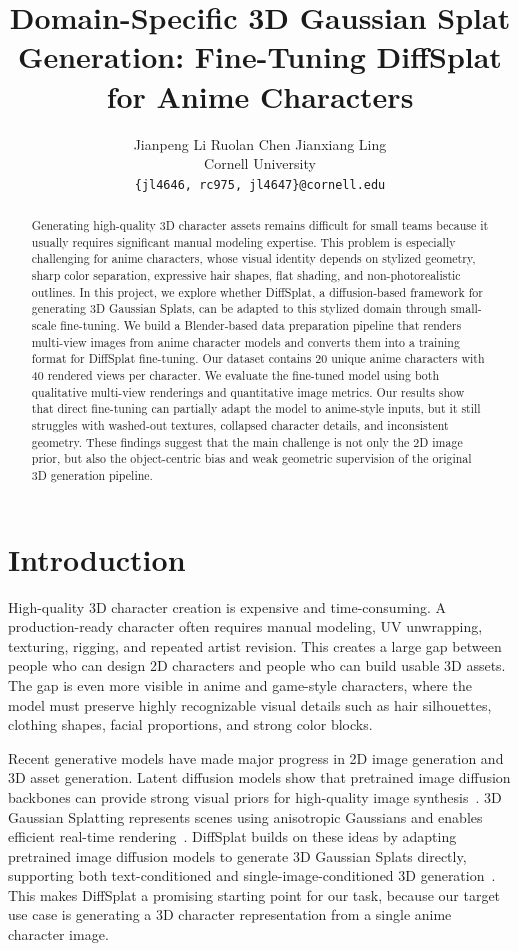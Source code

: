 \documentclass[10pt,twocolumn,letterpaper]{article}
\title{Domain-Specific 3D Gaussian Splat Generation: Fine-Tuning DiffSplat for Anime Characters}
\author{
Jianpeng Li \qquad Ruolan Chen \qquad Jianxiang Ling\\
Cornell University\\
{\tt\small \{jl4646, rc975, jl4647\}@cornell.edu}
}
\begin{document}
\maketitle

\begin{abstract}
Generating high-quality 3D character assets remains difficult for small teams because it usually requires significant manual modeling expertise. This problem is especially challenging for anime characters, whose visual identity depends on stylized geometry, sharp color separation, expressive hair shapes, flat shading, and non-photorealistic outlines. In this project, we explore whether DiffSplat, a diffusion-based framework for generating 3D Gaussian Splats, can be adapted to this stylized domain through small-scale fine-tuning. We build a Blender-based data preparation pipeline that renders multi-view images from anime character models and converts them into a training format for DiffSplat fine-tuning. Our dataset contains 20 unique anime characters with 40 rendered views per character. We evaluate the fine-tuned model using both qualitative multi-view renderings and quantitative image metrics. Our results show that direct fine-tuning can partially adapt the model to anime-style inputs, but it still struggles with washed-out textures, collapsed character details, and inconsistent geometry. These findings suggest that the main challenge is not only the 2D image prior, but also the object-centric bias and weak geometric supervision of the original 3D generation pipeline.
\end{abstract}

\section{Introduction}

High-quality 3D character creation is expensive and time-consuming. A production-ready character often requires manual modeling, UV unwrapping, texturing, rigging, and repeated artist revision. This creates a large gap between people who can design 2D characters and people who can build usable 3D assets. The gap is even more visible in anime and game-style characters, where the model must preserve highly recognizable visual details such as hair silhouettes, clothing shapes, facial proportions, and strong color blocks.

Recent generative models have made major progress in 2D image generation and 3D asset generation. Latent diffusion models show that pretrained image diffusion backbones can provide strong visual priors for high-quality image synthesis~\cite{rombach2022ldm}. 3D Gaussian Splatting represents scenes using anisotropic Gaussians and enables efficient real-time rendering~\cite{kerbl20233dgs}. DiffSplat builds on these ideas by adapting pretrained image diffusion models to generate 3D Gaussian Splats directly, supporting both text-conditioned and single-image-conditioned 3D generation~\cite{lin2025diffsplat}. This makes DiffSplat a promising starting point for our task, because our target use case is generating a 3D character representation from a single anime character image.
\end{document}
